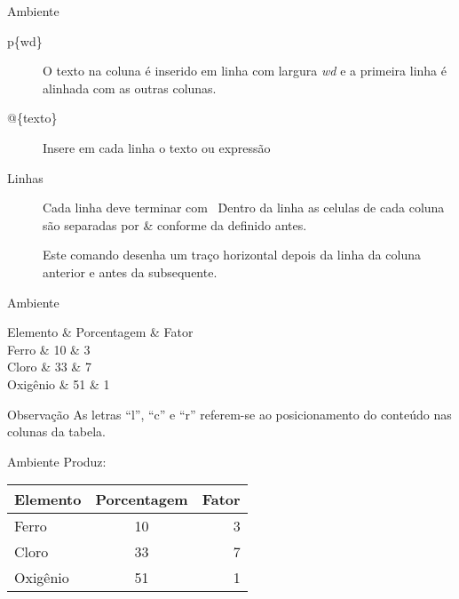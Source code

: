 \begin{frame}{Ambiente }
\begin{description}
	\item [p\{wd\}] O texto na coluna é inserido em linha com largura \emph{wd} e a primeira linha é alinhada com as outras colunas.
	\item [@\{texto\}] Insere em cada linha o texto ou expressão
	\item [Linhas] Cada linha deve terminar com \string\ \string\. Dentro da linha as celulas de cada coluna são separadas por \& conforme da definido antes.
	\item [\string\hline] Este comando desenha um traço horizontal depois da linha da coluna anterior e antes da subsequente.
\end{description}
\end{frame}

\begin{frame}{Ambiente }
\begin{LaTeXcode}[Exemplo]
\n
Elemento   \&  Porcentagem \& Fator \string\\ \n
\string\hline\string\hline \n
Ferro      \&  10          \& 3     \string\\ \string\hline \n
Cloro      \&  33          \& 7     \string\\ \string\hline \n
Oxigênio   \&  51          \& 1     \string\\ \string\hline \n
{}
\end{LaTeXcode}

\begin{block}{Observação}
As letras ``l'', ``c'' e ``r'' referem-se ao posicionamento do conteúdo nas colunas da tabela.
\end{block}
\end{frame}

\begin{frame}{Ambiente }
\fontsize{10}{11}\selectfont
Produz:
\begin{LaTeXoutput}
\begin{tabular}{l|c|r}                   
\hline
Elemento    &  Porcentagem  & Fator \\ \hline \hline
Ferro   &  10   & 3     \\ \hline
Cloro   &  33   & 7     \\ \hline
Oxigênio  &  51   & 1 \\ \hline
\end{tabular}
\end{LaTeXoutput}
\end{frame}

